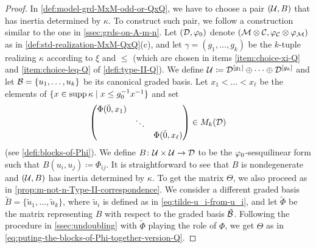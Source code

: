 \begin{proof}
    In \cref{def:model-grd-MxM-odd-or-QxQ}, we have to choose a pair $(\mathcal U, B)$ that has inertia determined by $\kappa$. 
    To construct such pair, we follow a construction similar to the one in \cref{ssec:grds-on-A-m-n}. 
    Let $(\mathcal{D}, \varphi_0)$ denote $(\mathcal M \otimes \mathcal C, \varphi_{\mathcal C} \otimes \varphi_{\mathcal M})$ as in \cref{def:std-realization-MxM-QxQ}(c), and let $\gamma = (g_1, \ldots, g_k)$ be the $k$-tuple realizing $\kappa$ according to $\xi$ and $\leq$ (which are chosen in items \eqref{item:choice-xi-Q} and \eqref{item:choice-leq-Q} of \cref{defi:type-II-Q}). 
    We define $\mathcal U \coloneqq \mathcal{D}^{[g_1]}\oplus \cdots \oplus \mathcal{D}^{[g_k]}$ and let $\mathcal B = \{ u_1, \ldots, u_k\}$ be its canonical graded basis. 
    Let $x_1 < \ldots < x_{\ell}$ be the elements of $\{ x \in \operatorname{supp} \kappa \mid x \leq g_0^{-1} x^{-1} \}$ and set 
    \[
        \begin{pmatrix}
        \Phi(\bar 0, x_1)&& \\
        & \ddots &\\
        && \Phi(\bar 0, x_{\ell})
    \end{pmatrix} \in M_k(\mathcal{D})
    \]
    (see \cref{defi:blocks-of-Phi}). 
    We define $B\colon \mathcal U \times \mathcal U \to \mathcal{D}$ to be the $\varphi_0$-sesquilinear form such that $B(u_i, u_j) \coloneqq \Phi_{ij}$. 
    It is straightforward to see that $B$ is nondegenerate and $(\mathcal U, B)$ has inertia determined by $\kappa$. 
    To get the matrix $\Theta$, we also proceed as in \cref{prop:m-not-n-Type-II-correspondence}. 
    We consider a different graded basis $\tilde B = \{ \tilde u_1, \ldots, \tilde u_k \}$, where $\tilde u_i$ is defined as in \cref{eq:tilde-u_i-from-u_i}, and let $\tilde \Phi$ be the matrix representing $B$ with respect to the graded basis $\tilde {\mathcal B}$. 
    Following the procedure in \cref{ssec:undoubling} with $\tilde \Phi$ playing the role of $\Phi$, we get  $\Theta$ as in \cref{eq:puting-the-blocks-of-Phi-together-version-Q}.

\end{proof}
